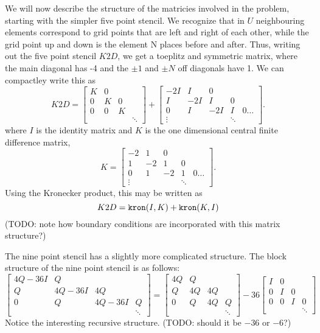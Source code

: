 We will now describe the structure of the matricies involved in the problem, starting with the simpler five point stencil.
We recognize that in $U$ neighbouring elements correspond to grid points that are left and right of each other, while the grid point up and down is the element N places before and after.
Thus, writing out the five point stencil $K2D$, we get a toeplitz and symmetric matrix, where the main diagonal has -4 and the $\pm 1$ and $\pm N$ off diagonals have 1.
We can compactley write this as
$$
K2D =
\begin{bmatrix}
  K & 0 \\
  0 & K & 0\\
  0 & 0 & K \\
  &&&\ddots
\end{bmatrix}
+
\begin{bmatrix}
  -2I & I & 0 &  \\
  I & -2I & I & 0 \\
  0 & I & -2I & I & 0 \dots\\
  \vdots&&&\ddots
\end{bmatrix}.
$$
where $I$ is the identity matrix and $K$ is the one dimensional central finite difference matrix,
$$
K =
\begin{bmatrix}
  -2 & 1 & 0 &  \\
  1 & -2 & 1 & 0 \\
  0 & 1 & -2 & 1 & 0 \dots\\
  \vdots&&&\ddots
\end{bmatrix}.
$$
Using the Kronecker product, this may be written as
$$
K2D = \verb|kron|(I, K) + \verb|kron|(K, I)
$$
(TODO: note how boundary conditions are incorporated with this matrix structure?)

The nine point stencil has a slightly more complicated structure.
The block structure of the nine point stencil is as follows:
$$
\begin{bmatrix}
  4Q - 36 I & Q \\
  Q & 4Q - 36 I & 4Q \\
  0 & Q & 4Q - 36 I & Q \\
  & & & \ddots
\end{bmatrix}
=
\begin{bmatrix}
  4Q & Q \\
  Q & 4Q & 4Q \\
  0 & Q & 4Q & Q \\
  & & & \ddots
\end{bmatrix}
-
36
\begin{bmatrix}
  I & 0 \\
  0 & I & 0 \\
  0 & 0 & I & 0 \\
  & & & \ddots
\end{bmatrix}
$$
Notice the interesting recursive structure.
(TODO: should it be $-36$ or $-6$?)

